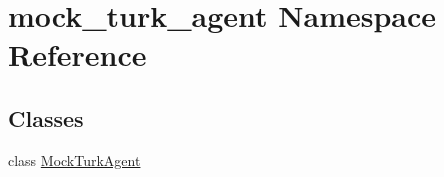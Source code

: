 \hypertarget{namespacemock__turk__agent}{}\section{mock\+\_\+turk\+\_\+agent Namespace Reference}
\label{namespacemock__turk__agent}
\subsection*{Classes}
\begin{DoxyCompactItemize}
\item 
class \hyperlink{classmock__turk__agent_1_1MockTurkAgent}{Mock\+Turk\+Agent}
\end{DoxyCompactItemize}

